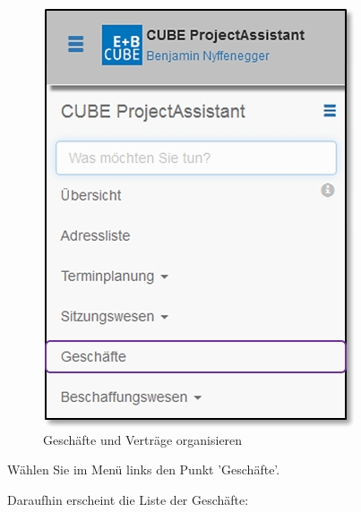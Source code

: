 \begin{figure}   %
  \vspace{-35pt}      %
  \begin{center}
    \includegraphics[width=1\linewidth]{../chapters/06_Geschaefte/pictures/6-1_Menu_Geschaefte.jpg}
  \end{center}
  \vspace{-20pt}
  \caption{Geschäfte und Verträge organisieren}
  \vspace{-10pt}
\end{figure}

Wählen Sie im Menü links den Punkt 'Geschäfte'. \\

\vspace{6cm}

Daraufhin erscheint die Liste der Geschäfte:

